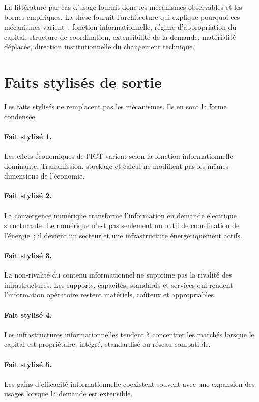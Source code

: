 La littérature par cas d'usage fournit donc les mécanismes observables et les bornes empiriques. La thèse fournit l'architecture qui explique pourquoi ces mécanismes varient~: fonction informationnelle, régime d'appropriation du capital, structure de coordination, extensibilité de la demande, matérialité déplacée, direction institutionnelle du changement technique.

\section{Faits stylisés de sortie}

Les faits stylisés ne remplacent pas les mécanismes. Ils en sont la forme condensée.

\paragraph{Fait stylisé 1.}
Les effets économiques de l'ICT varient selon la fonction informationnelle dominante. Transmission, stockage et calcul ne modifient pas les mêmes dimensions de l'économie.

\paragraph{Fait stylisé 2.}
La convergence numérique transforme l'information en demande électrique structurante. Le numérique n'est pas seulement un outil de coordination de l'énergie~; il devient un secteur et une infrastructure énergétiquement actifs.

\paragraph{Fait stylisé 3.}
La non-rivalité du contenu informationnel ne supprime pas la rivalité des infrastructures. Les supports, capacités, standards et services qui rendent l'information opératoire restent matériels, coûteux et appropriables.

\paragraph{Fait stylisé 4.}
Les infrastructures informationnelles tendent à concentrer les marchés lorsque le capital est propriétaire, intégré, standardisé ou réseau-compatible.

\paragraph{Fait stylisé 5.}
Les gains d'efficacité informationnelle coexistent souvent avec une expansion des usages lorsque la demande est extensible.

